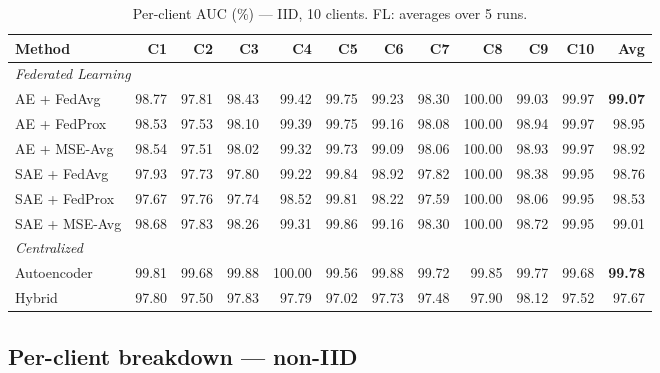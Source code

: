 \documentclass[11pt,a4paper]{article}
\begin{document}
\begin{table}[ht]
\centering
\caption{Per-client AUC (\%) — IID, 10 clients. FL: averages over 5 runs.}
\label{tab:per-client-iid}
\tiny\setlength{\tabcolsep}{4pt}
\begin{tabular}{lrrrrrrrrrrr}
\toprule
\textbf{Method} & C1 & C2 & C3 & C4 & C5 & C6 & C7 & C8 & C9 & C10 & \textbf{Avg} \\
\midrule
\multicolumn{12}{l}{\textit{Federated Learning}} \\
AE + FedAvg     & 98.77 & 97.81 & 98.43 & 99.42 & 99.75 & 99.23 & 98.30 & 100.00 & 99.03 & 99.97 & \textbf{99.07} \\
AE + FedProx    & 98.53 & 97.53 & 98.10 & 99.39 & 99.75 & 99.16 & 98.08 & 100.00 & 98.94 & 99.97 & 98.95 \\
AE + MSE-Avg    & 98.54 & 97.51 & 98.02 & 99.32 & 99.73 & 99.09 & 98.06 & 100.00 & 98.93 & 99.97 & 98.92 \\
SAE + FedAvg    & 97.93 & 97.73 & 97.80 & 99.22 & 99.84 & 98.92 & 97.82 & 100.00 & 98.38 & 99.95 & 98.76 \\
SAE + FedProx   & 97.67 & 97.76 & 97.74 & 98.52 & 99.81 & 98.22 & 97.59 & 100.00 & 98.06 & 99.95 & 98.53 \\
SAE + MSE-Avg   & 98.68 & 97.83 & 98.26 & 99.31 & 99.86 & 99.16 & 98.30 & 100.00 & 98.72 & 99.95 & 99.01 \\
\midrule
\multicolumn{12}{l}{\textit{Centralized}} \\
Autoencoder     & 99.81 & 99.68 & 99.88 & 100.00 & 99.56 & 99.88 & 99.72 & 99.85 & 99.77 & 99.68 & \textbf{99.78} \\
Hybrid          & 97.80 & 97.50 & 97.83 & 97.79  & 97.02 & 97.73 & 97.48 & 97.90 & 98.12 & 97.52 & 97.67 \\
\bottomrule
\end{tabular}
\end{table}

\subsection{Per-client breakdown — non-IID}
\end{document}
